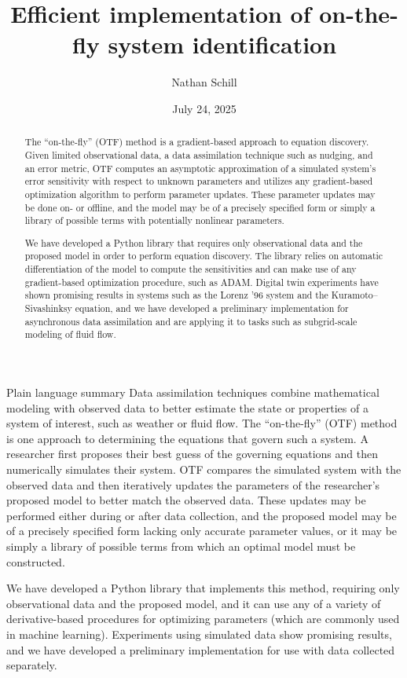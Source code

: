 \documentclass[12pt]{article}
\title{Efficient implementation of on-the-fly system identification}
\author{Nathan Schill}
\date{July 24, 2025}
\begin{document}
\maketitle

\begin{abstract}
  The ``on-the-fly'' (OTF) method is a gradient-based approach to equation discovery.
  Given limited observational data, a data assimilation technique such as nudging, and an error metric, OTF computes an asymptotic approximation of a simulated system's error sensitivity with respect to unknown parameters and utilizes any gradient-based optimization algorithm to perform parameter updates.
  These parameter updates may be done on- or offline, and the model may be of a precisely specified form or simply a library of possible terms with potentially nonlinear parameters.

  We have developed a Python library that requires only observational data and the proposed model in order to perform equation discovery.
  The library relies on automatic differentiation of the model to compute the sensitivities and can make use of any gradient-based optimization procedure, such as ADAM.
  Digital twin experiments have shown promising results in systems such as the Lorenz '96 system and the Kuramoto--Sivashinksy equation, and we have developed a preliminary implementation for asynchronous data assimilation and are applying it to tasks such as subgrid-scale modeling of fluid flow.
\end{abstract}

\begin{section}{Plain language summary}
  Data assimilation techniques combine mathematical modeling with observed data to better estimate the state or properties of a system of interest, such as weather or fluid flow.
  The ``on-the-fly'' (OTF) method is one approach to determining the equations that govern such a system.
  A researcher first proposes their best guess of the governing equations and then numerically simulates their system.
  OTF compares the simulated system with the observed data and then iteratively updates the parameters of the researcher's proposed model to better match the observed data.
  These updates may be performed either during or after data collection, and the proposed model may be of a precisely specified form lacking only accurate parameter values, or it may be simply a library of possible terms from which an optimal model must be constructed.

  We have developed a Python library that implements this method, requiring only observational data and the proposed model, and it can use any of a variety of derivative-based procedures for optimizing parameters (which are commonly used in machine learning).
  Experiments using simulated data show promising results, and we have developed a preliminary implementation for use with data collected separately.
\end{section}
\end{document}
